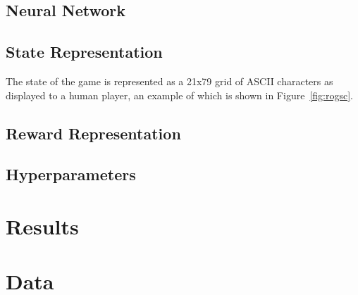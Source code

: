 \documentclass[12pt,a4paper]{article}
\begin{document}
    \subsection{Neural Network}\label{subsec:neural-network2}

    \subsection{State Representation}\label{subsec:state-representation}
    The state of the game is represented as a 21x79 grid of ASCII characters as displayed to a human player, an example
    of which is shown in Figure~\ref{fig:rogsc}.

    \subsection{Reward Representation}\label{subsec:reward-representation}

    \subsection{Hyperparameters}\label{subsec:hyperparameters}


    \section{Results}\label{sec:results}


    \section{Data}\label{sec:data}
\end{document}
